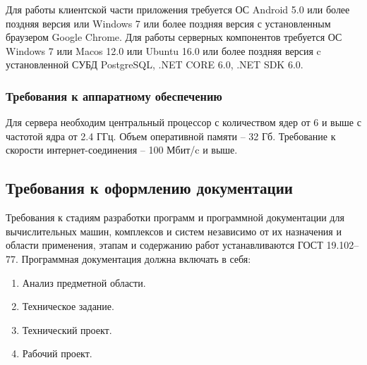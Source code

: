Для работы клиентской части приложения требуется ОС Android 5.0 или более поздняя версия или Windows 7 или более поздняя версия с установленным браузером Google Chrome.
Для работы серверных компонентов требуется ОС Windows 7 или Macos 12.0 или Ubuntu 16.0 или более поздняя версия c установленной СУБД PostgreSQL, .NET CORE 6.0, .NET SDK 6.0.

\subsubsection{Требования к аппаратному обеспечению}
Для сервера необходим центральный процессор с количеством ядер от 6 и выше с частотой ядра от 2.4 ГГц. Объем оперативной памяти – 32 Гб. Требование к скорости интернет-соединения – 100 Мбит/c и выше.

\subsection{Требования к оформлению документации}
Требования к стадиям разработки программ и программной документации для вычислительных машин, комплексов и систем независимо от их назначения и области применения, этапам и содержанию работ устанавливаются ГОСТ 19.102–77.
Программная документация должна включать в себя:

\begin{enumerate}
\item Анализ предметной области.
\item Техническое задание.
\item Технический проект.
\item Рабочий проект.
\end{enumerate}
